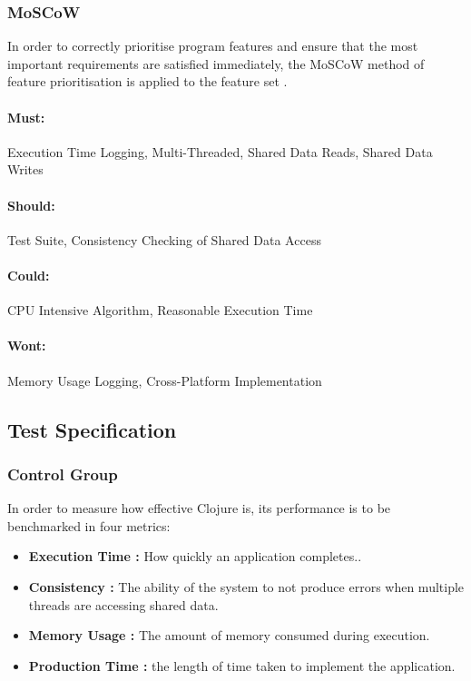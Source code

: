 \documentclass[12pt,a4paper]{article}
\begin{document}
\subsubsection{MoSCoW}

In order to correctly prioritise program features and ensure that the most important requirements are satisfied immediately, the MoSCoW method of feature prioritisation is applied to the feature set \cite{moscow}.

\paragraph{Must:}
Execution Time Logging,
Multi-Threaded,
Shared Data Reads,
Shared Data Writes

\paragraph{Should:}
Test Suite,
Consistency Checking of Shared Data Access

\paragraph{Could:}
CPU Intensive Algorithm,
Reasonable Execution Time

\paragraph{Wont:}
Memory Usage Logging, 
Cross-Platform Implementation


\newpage
\subsection{Test Specification}

\subsubsection{Control Group}

In order to measure how effective Clojure is, its performance is to be benchmarked in four metrics:

\begin{itemize} \itemsep0pt
        \item \textbf{Execution Time :} How quickly an application completes..
        \item \textbf{Consistency :} The ability of the system to not produce errors when multiple threads are accessing shared data.
        \item \textbf{Memory Usage :} The amount of memory consumed during execution.
        \item \textbf{Production Time :} the length of time taken to implement the application.
\end{itemize}
\end{document}
